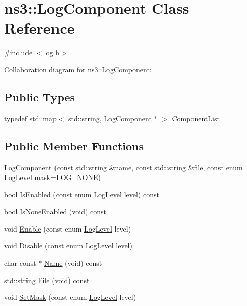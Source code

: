 \hypertarget{classns3_1_1LogComponent}{}\section{ns3\+:\+:Log\+Component Class Reference}
\label{classns3_1_1LogComponent}


{\ttfamily \#include $<$log.\+h$>$}



Collaboration diagram for ns3\+:\+:Log\+Component\+:
\subsection*{Public Types}
\begin{DoxyCompactItemize}
\item 
typedef std\+::map$<$ std\+::string, \hyperlink{classns3_1_1LogComponent}{Log\+Component} $\ast$ $>$ \hyperlink{classns3_1_1LogComponent_ab33052bb0294bc3014a31bcc17032199}{Component\+List}
\end{DoxyCompactItemize}
\subsection*{Public Member Functions}
\begin{DoxyCompactItemize}
\item 
\hyperlink{classns3_1_1LogComponent_aaa3477d5874bd4d30f4ffc8240892877}{Log\+Component} (const std\+::string \&\hyperlink{generate__test__data__lte__spectrum__model_8m_ab74e6bf80237ddc4109968cedc58c151}{name}, const std\+::string \&file, const enum \hyperlink{namespacens3_aa6464a4d69551a9cc968e17a65f39bdb}{Log\+Level} mask=\hyperlink{namespacens3_aa6464a4d69551a9cc968e17a65f39bdba13d43c64886d177234aa3e1cd72830db}{L\+O\+G\+\_\+\+N\+O\+NE})
\item 
bool \hyperlink{classns3_1_1LogComponent_ac5c8773e75905f4962094937f8fd0e5a}{Is\+Enabled} (const enum \hyperlink{namespacens3_aa6464a4d69551a9cc968e17a65f39bdb}{Log\+Level} level) const 
\item 
bool \hyperlink{classns3_1_1LogComponent_aaa1f3f8bace28e9fb4fe4653e1e750ab}{Is\+None\+Enabled} (void) const 
\item 
void \hyperlink{classns3_1_1LogComponent_a3e0f18a35d2d3a0fb4825d369ec86bb7}{Enable} (const enum \hyperlink{namespacens3_aa6464a4d69551a9cc968e17a65f39bdb}{Log\+Level} level)
\item 
void \hyperlink{classns3_1_1LogComponent_a71d6b5b49c4835a17cfbc8fc5ef4f574}{Disable} (const enum \hyperlink{namespacens3_aa6464a4d69551a9cc968e17a65f39bdb}{Log\+Level} level)
\item 
char const $\ast$ \hyperlink{classns3_1_1LogComponent_a17c4c5b7eddc45645d9c91d9f93e04e4}{Name} (void) const 
\item 
std\+::string \hyperlink{classns3_1_1LogComponent_adc5d81da377e8c4b67393877bc903adf}{File} (void) const 
\item 
void \hyperlink{classns3_1_1LogComponent_aa1e9b4c88ac9480e4808cc1755adad45}{Set\+Mask} (const enum \hyperlink{namespacens3_aa6464a4d69551a9cc968e17a65f39bdb}{Log\+Level} level)
\end{DoxyCompactItemize}
